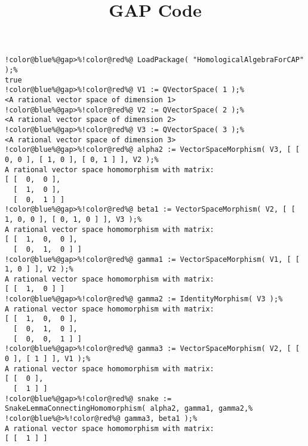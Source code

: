 \documentclass[12pt]{amsart}
\title{GAP Code}
\author{}
\begin{document}
\maketitle

\begin{Verbatim}[commandchars=!@\%,frame=single]
!color@blue%@gap>%!color@red%@ LoadPackage( "HomologicalAlgebraForCAP" );%
true
!color@blue%@gap>%!color@red%@ V1 := QVectorSpace( 1 );%
<A rational vector space of dimension 1>
!color@blue%@gap>%!color@red%@ V2 := QVectorSpace( 2 );%
<A rational vector space of dimension 2>
!color@blue%@gap>%!color@red%@ V3 := QVectorSpace( 3 );%
<A rational vector space of dimension 3>
!color@blue%@gap>%!color@red%@ alpha2 := VectorSpaceMorphism( V3, [ [ 0, 0 ], [ 1, 0 ], [ 0, 1 ] ], V2 );%
A rational vector space homomorphism with matrix: 
[ [  0,  0 ],
  [  1,  0 ],
  [  0,  1 ] ]
!color@blue%@gap>%!color@red%@ beta1 := VectorSpaceMorphism( V2, [ [ 1, 0, 0 ], [ 0, 1, 0 ] ], V3 );%
A rational vector space homomorphism with matrix: 
[ [  1,  0,  0 ],
  [  0,  1,  0 ] ]
!color@blue%@gap>%!color@red%@ gamma1 := VectorSpaceMorphism( V1, [ [ 1, 0 ] ], V2 );%
A rational vector space homomorphism with matrix: 
[ [  1,  0 ] ]
!color@blue%@gap>%!color@red%@ gamma2 := IdentityMorphism( V3 );%
A rational vector space homomorphism with matrix: 
[ [  1,  0,  0 ],
  [  0,  1,  0 ],
  [  0,  0,  1 ] ]
!color@blue%@gap>%!color@red%@ gamma3 := VectorSpaceMorphism( V2, [ [ 0 ], [ 1 ] ], V1 );%
A rational vector space homomorphism with matrix: 
[ [  0 ],
  [  1 ] ]
!color@blue%@gap>%!color@red%@ snake := SnakeLemmaConnectingHomomorphism( alpha2, gamma1, gamma2,%
!color@blue%@>%!color@red%@ gamma3, beta1 );%
A rational vector space homomorphism with matrix: 
[ [  1 ] ]
\end{Verbatim}
\end{document}
